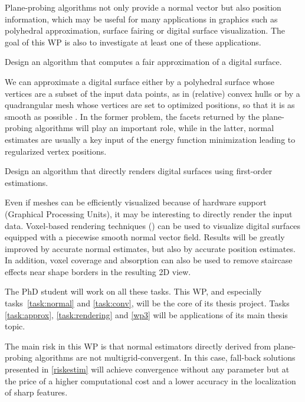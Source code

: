 Plane-probing algorithms not only provide a normal vector but also position information,
which may be useful for many applications in graphics such as polyhedral approximation,
surface fairing or digital surface visualization. The goal of this WP is also to investigate
at least one of these applications.   
%
\begin{Task}
  \label{task:approx}
  Design an algorithm that computes a fair approximation of a digital surface. 
\end{Task}

We can approximate a digital surface either by a polyhedral surface whose vertices 
are a subset of the input data points, as in (relative) convex hulls 
\cite{Klette2001,Schultz2009} 
or by a quadrangular mesh whose vertices are set to optimized positions, so that it is
as smooth as possible \cite{Coeurjolly2017}. In the former problem, the facets returned
by the plane-probing algorithms will play an important role, while in the latter,
normal estimates are usually a key input of the energy function minimization leading
to regularized vertex positions.  
%
\begin{Task}
  \label{task:rendering}
  Design an algorithm that directly renders digital surfaces using first-order estimations.  
\end{Task}

Even if meshes can be efficiently visualized because of hardware
support (Graphical Processing Units), it may be interesting to
directly render the input data. Voxel-based rendering techniques
(\eg \cite{DBLP:conf/si3d/CrassinNLE09}) can be used to
visualize digital surfaces equipped with a piecewise smooth normal
vector field. Results will be greatly improved by accurate normal estimates,
but also by accurate position estimates. In addition, voxel coverage and absorption can
also be used to remove staircase effects near shape borders in the resulting 2D view.

The PhD student will work on all these tasks. This WP, and especially tasks~\ref{task:normal}
and \ref{task:conv}, will be the core of its thesis project. Tasks \ref{task:approx},
\ref{task:rendering} and \ref{wp3} will be applications of its main thesis topic.  

\Risks
The main risk in this WP is that normal estimators
directly derived from plane-probing algorithms are not multigrid-convergent.
In this case, fall-back solutions presented in \ref{riskestim} will achieve
convergence without any parameter but at the price of a higher computational
cost and a lower accuracy in the localization of sharp features. 

